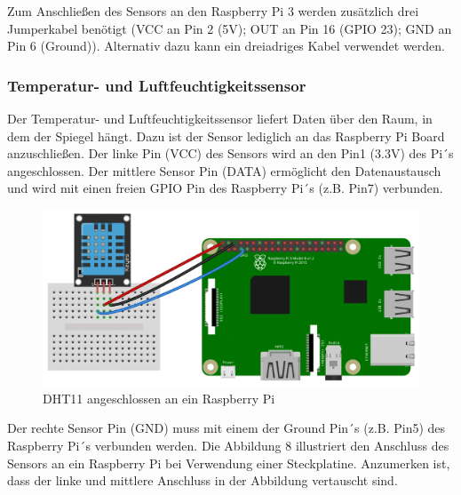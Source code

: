 Zum Anschließen des Sensors an den Raspberry Pi 3 werden zusätzlich drei Jumperkabel benötigt (VCC an Pin 2 (5V); OUT an Pin 16 (GPIO 23); GND an Pin 6 (Ground)). Alternativ dazu kann ein dreiadriges Kabel verwendet werden.

\subsubsection*{Temperatur- und Luftfeuchtigkeitssensor}
Der Temperatur- und Luftfeuchtigkeitssensor liefert Daten über den Raum, in dem der Spiegel hängt. Dazu ist der Sensor lediglich an das Raspberry Pi Board anzuschließen.
 Der linke Pin (VCC) des Sensors wird an den Pin1 (3.3V) des Pi´s angeschlossen. Der mittlere Sensor Pin (DATA)  ermöglicht den Datenaustausch und wird mit einen freien GPIO Pin des Raspberry Pi´s (z.B. Pin7) verbunden. 
\begin{figure}[H]
	\includegraphics[trim=0mm 0mm 0mm 0mm, scale=1]{bilder/DHT11-on-the-Raspberry-Pi.png}
	\caption{DHT11 angeschlossen an ein Raspberry Pi}
\end{figure}
Der rechte Sensor Pin (GND) muss mit einem der Ground Pin´s (z.B. Pin5) des Raspberry Pi´s verbunden werden. Die Abbildung 8 illustriert den Anschluss des Sensors an ein Raspberry Pi bei Verwendung einer Steckplatine. Anzumerken ist, dass der linke und mittlere Anschluss in der Abbildung vertauscht sind.


